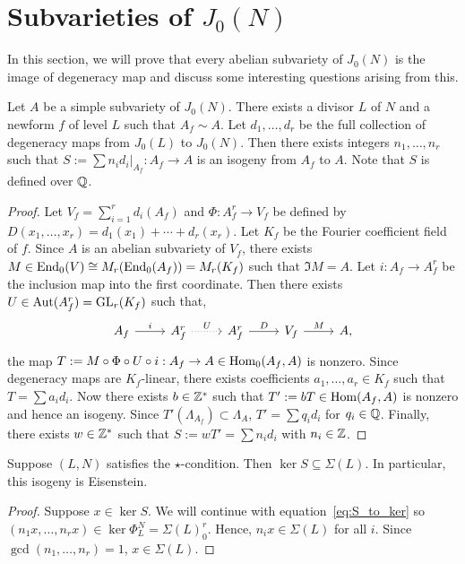 \documentclass[11pt, proquest]{uwthesis}
\begin{document}
\section{Subvarieties of $J_0(N)$}%
\label{sec:subvarieties_of_j_0_n_}

In this section, we will prove that every abelian subvariety of $J_0(N)$ is the
image of degeneracy map and discuss some interesting questions arising from
this.

\begin{proposition}
    \label{prop:integral_degen}
    Let $A$ be a simple subvariety of $J_0(N)$. There exists a divisor $L$ of
    $N$ and a newform $f$ of level $L$ such that $A_f \sim A$. Let
    $d_1,\ldots,d_r$ be the full collection of degeneracy maps from $J_0(L)$ to
    $J_0(N)$. Then there exists integers $n_1,\ldots,n_r$ such that $S:=\sum
    n_i d_i|_{A_f}: A_f\to A$ is an isogeny from $A_f$ to $A$. Note that $S$ is
    defined over $\mathbb{Q}$.
\end{proposition}
\begin{proof}
    Let $V_f=\sum_{i=1} ^r d_i(A_f)$ and $\Phi:A_f ^r \to V_f$ be defined by
    $D(x_1,\ldots,x_r) = d_1(x_1)+\cdots+d_r(x_r)$. Let $K_f$ be the Fourier
    coefficient field of $f$. Since $A$ is an abelian subvariety of $V_f$, there
    exists $M\in \operatorname{End}_0(V)\cong M_r(\operatorname{End}_0(A_f)) = M_r (K_f)$ such that $\Im M
    = A$. Let $i:A_f\to A_f ^r$ be the inclusion map into the first coordinate.
    Then there exists $U\in \operatorname{Aut}(A_f ^r)=\operatorname{GL}_r (K_f)$ such that,
    \[
        \begin{tikzcd}
            A_f \arrow[r,"i"] &
            A_f ^r \arrow[r, dotted, "U"] &
            A_f ^r \arrow[r, "D"] &
            V_f \arrow[r, "M"] &
            A,
        \end{tikzcd}
    \]
    the map $T:=M \circ \Phi \circ U\circ i:A_f\to A\in \operatorname{Hom}_0(A_f, A)$ is
    nonzero. Since degeneracy maps are $K_f$-linear, there exists coefficients
    $a_1,\ldots,a_r\in K_f$ such that $T = \sum a_i d_i$. Now there exists
    $b\in \mathbb{Z}^*$ such that $T':=bT\in \operatorname{Hom}(A_f, A)$ is nonzero and hence an
    isogeny. Since $T'(\Lambda_{A_f})\subset \Lambda_A$, $T'=\sum q_i d_i$
    for $q_i\in \mathbb{Q}$. Finally, there exists $w\in \mathbb{Z}^*$ such that
    $S:=wT'=\sum n_i d_i$ with $n_i\in \mathbb{Z}$.
\end{proof}


\begin{proposition}
    \label{prop:star_eisenstein}
    Suppose $(L, N)$ satisfies the $\star$-condition. Then $\ker S\subseteq
    \Sigma(L)$. In particular, this isogeny is Eisenstein.
\end{proposition}
\begin{proof}
    Suppose $x\in \ker S$. We will continue with equation~\eqref{eq:S_to_ker}
    so $(n_1 x, \ldots, n_r x)\in \ker\Phi_L ^N = \Sigma(L)_0 ^r$. Hence, $n_i x\in
    \Sigma(L)$ for all $i$. Since $\gcd(n_1,\ldots,n_r)=1$, $x\in \Sigma(L)$.
\end{proof}
\end{document}
